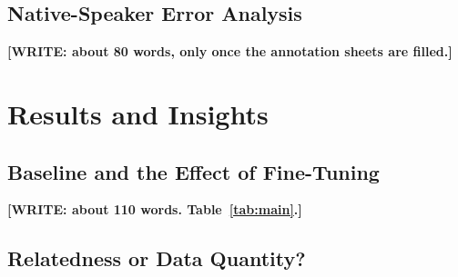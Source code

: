 \documentclass[conference]{IEEEtran}
\newcommand{\WRITE}[1]{{\color{red}\textbf{[WRITE: #1]}}}
\begin{document}
\subsection{Native-Speaker Error Analysis}

\WRITE{about 80 words, only once the annotation sheets are filled.}

\section{Results and Insights}



\subsection{Baseline and the Effect of Fine-Tuning}

\WRITE{about 110 words. Table~\ref{tab:main}.}

\subsection{Relatedness or Data Quantity?}
\end{document}
